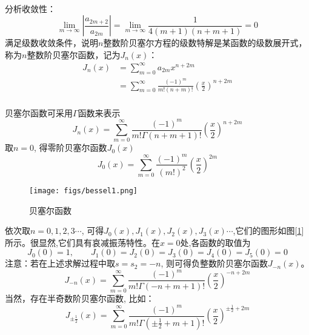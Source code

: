 ~~\\ 
分析收敛性：
	\begin{equation*}
		\lim\limits_{m\to \infty}|\frac{ a_{2m+2}} {a_{2m}}|= \lim\limits_{m\to \infty}\frac{ 1}{4(m+1)(n+m+1)} =0
	\end{equation*}	
	满足级数收敛条件，说明$n$整数阶贝塞尔方程的级数特解是某函数的级数展开式，称为$n$整数阶贝塞尔函数，记为$J_n(x)$：
	\begin{equation}
		\boxed{\begin{aligned}
			J_n(x) &=\sum\limits_{m=0}^{\infty} a_{2m} x^{n+2m}  \\ 
			&= \sum\limits_{m=0}^{\infty}  \frac{(-1)^m }{ m! (n+m) ! } \left(\frac{x}{2}\right)^{n+2m} 
		\end{aligned}}
		\end{equation}
	~~\\ 
	贝塞尔函数可采用$\Gamma $函数来表示
	\begin{equation}
		\boxed{
			J_n(x) = \sum\limits_{m=0}^{\infty}  \frac{(-1)^m }{ m! \Gamma (n+m+1) ! } \left(\frac{x}{2}\right)^{n+2m} }
		\end{equation}
	取$n=0$, 得零阶贝塞尔函数$J_0(x)$
	\begin{equation*}
			J_0(x)  =\sum\limits_{m=0}^{\infty}  \frac{(-1)^m }{ (m!)^2 } \left(\frac{x}{2}\right)^{2m} 
	\end{equation*}

	\begin{figure}[h]
		\centering
		\texttt{[image: figs/bessel1.png]}
		\caption{贝塞尔函数}
		\label{fig:bessel1}
	\end{figure}


	依次取$n=0,1,2,3\cdots$, 可得$J_0(x),J_1(x),J_2(x),J_3(x)\cdots$,它们的图形如图[\ref{fig:bessel1}]所示。很显然,它们具有哀减振荡特性。在$x=0$处,各函数的取值为
	\begin{equation*}
		J_0(0)=1,\qquad J_1(0)=J_2(0) =J_3(0) = J_4(0) =J_5(0) = 0 
	\end{equation*}	
	注意：若在上述求解过程中取$s=s_2=-n$, 则可得负整数阶贝塞尔函数$J_{-n}(x)$。
	\begin{equation}
		\boxed{
			J_{-n}(x) = \sum\limits_{m=0}^{\infty}  \frac{(-1)^m }{ m! \Gamma (-n+m+1) ! } \left(\frac{x}{2}\right)^{-n+2m} }
		\end{equation}
	当然，存在半奇数阶贝塞尔函数, 比如：
	\begin{equation}
		\boxed{
			J_{\pm\frac{1}{2}}(x) = \sum\limits_{m=0}^{\infty}  \frac{(-1)^m }{ m! \Gamma (\pm \frac{1}{2}+m+1) ! } \left(\frac{x}{2}\right)^{\pm\frac{1}{2}+2m} }
		\end{equation} 
~~\\ 

